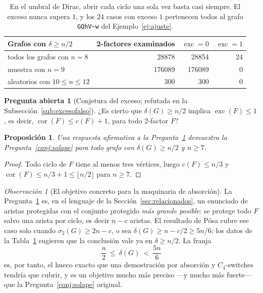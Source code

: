 \documentclass[11pt,a4paper]{article}
\newtheorem{proposicion}[teorema]{Proposición}
\theoremstyle{definition}
\newtheorem{pregunta}[teorema]{Pregunta abierta}
\theoremstyle{remark}
\newtheorem{observacion}[teorema]{Observación}
\begin{document}
\begin{table}[h]
\centering
\begin{tabular}{lrrr}
\toprule
Grafos con $\delta\ge n/2$ & 2-factores examinados & $\operatorname{exc}=0$ & $\operatorname{exc}=1$\\
\midrule
todos los grafos con $n=8$ & 28878 & 28854 & 24\\
muestra con $n=9$ & 176089 & 176089 & 0\\
aleatorios con $10\le n\le12$ & 300 & 300 & 0\\
\bottomrule
\end{tabular}
\caption{En el umbral de Dirac, abrir cada ciclo una sola vez basta casi siempre. El exceso nunca supera $1$, y los $24$ casos con exceso $1$ pertenecen todos al grafo \texttt{GQhV\~{}w} del Ejemplo~\ref{ej:ajuste}.}\label{tab:exceso}
\end{table}

\begin{pregunta}[Conjetura del exceso; refutada en la Subsección~\ref{sub:excesofalso}]\label{conj:exceso}
¿Es cierto que $\delta(G)\ge n/2$ implica $\operatorname{exc}(F)\le1$, es decir, $\operatorname{cor}(F)\le c(F)+1$, para todo 2-factor $F$?
\end{pregunta}

\begin{proposicion}\label{prop:excesoimplica}
Una respuesta afirmativa a la Pregunta~\ref{conj:exceso} demuestra la Pregunta~\ref{conj:solape} para todo grafo con $\delta(G)\ge n/2$ y $n\ge7$.
\end{proposicion}

\begin{proof}
Todo ciclo de $F$ tiene al menos tres vértices, luego $c(F)\le n/3$ y $\operatorname{cor}(F)\le n/3+1\le\lfloor n/2\rfloor$ para $n\ge7$.
\end{proof}

\begin{observacion}[El objetivo concreto para la maquinaria de absorción]\label{obs:objetivoabsorcion}
La Pregunta~\ref{conj:exceso} es, en el lenguaje de la Sección~\ref{sec:relacionados}, un enunciado de aristas protegidas con el conjunto protegido \emph{más grande posible}: se protege todo $F$ salvo una arista por ciclo, es decir $n-c$ aristas. El resultado de Pósa cubre ese caso solo cuando $\sigma_2(G)\ge 2n-c$, o sea $\delta(G)\ge n-c/2\ge 5n/6$; los datos de la Tabla~\ref{tab:exceso} sugieren que la conclusión vale ya en $\delta\ge n/2$. La franja
\[
\frac n2\ \le\ \delta(G)\ <\ \frac{5n}{6}
\]
es, por tanto, el hueco exacto que una demostración por absorción y $C_4$-switches tendría que cubrir, y es un objetivo mucho más preciso —y mucho más fuerte— que la Pregunta~\ref{conj:solape} original.
\end{observacion}
\end{document}
